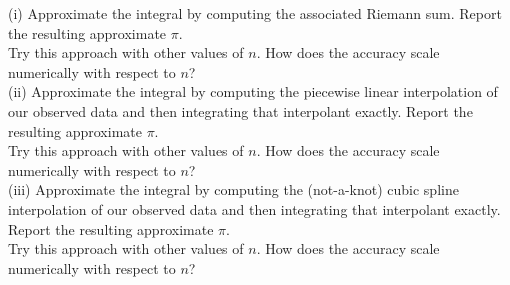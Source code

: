 \documentclass[11pt]{article}
\begin{document}
\noindent (i) Approximate the integral by computing the associated Riemann sum. Report the resulting approximate $\pi$.\\
Try this approach with other values of $n$. How does the accuracy scale numerically with respect to $n$?\\

\noindent (ii) Approximate the integral by computing the piecewise linear interpolation of our observed data and then integrating that interpolant exactly. Report the resulting approximate $\pi$.\\
Try this approach with other values of $n$. How does the accuracy scale numerically with respect to $n$?\\

\noindent (iii) Approximate the integral by computing the (not-a-knot) cubic spline interpolation of our observed data and then integrating that interpolant exactly. Report the resulting approximate $\pi$.\\
Try this approach with other values of $n$. How does the accuracy scale numerically with respect to $n$?\\
\end{document}
